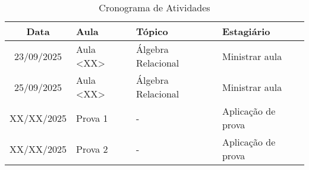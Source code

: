 \documentclass[12pt, a4paper]{article}
\begin{document}
\begin{table}[htbp] \centering \caption{Cronograma de Atividades} \label{tab:atividades}
    \begin{tabular}{|c|l|l|l|} \hline
        \textbf{Data} & \textbf{Aula} & \textbf{Tópico} & \textbf{Estagiário} \\ \hline
        
        23/09/2025 & Aula <XX> & Álgebra Relacional & Ministrar aula \\ \hline
        25/09/2025 & Aula <XX> & Álgebra Relacional & Ministrar aula \\ \hline
        XX/XX/2025 & Prova 1 & - & Aplicação de prova \\ \hline
        XX/XX/2025 & Prova 2 & - & Aplicação de prova \\ \hline
    \end{tabular}
\end{table}
\end{document}
